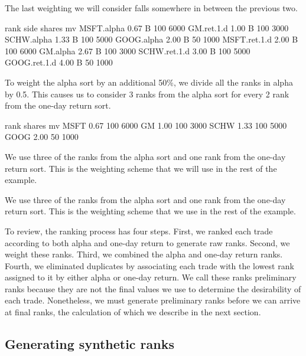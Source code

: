 \documentclass{article}
\begin{document}
The last weighting we will consider falls somewhere in between the
previous two.  

\begin{Schunk}
\begin{Soutput}
             rank side shares   mv
MSFT.alpha   0.67    B    100 6000
GM.ret.1.d   1.00    B    100 3000
SCHW.alpha   1.33    B    100 5000
GOOG.alpha   2.00    B     50 1000
MSFT.ret.1.d 2.00    B    100 6000
GM.alpha     2.67    B    100 3000
SCHW.ret.1.d 3.00    B    100 5000
GOOG.ret.1.d 4.00    B     50 1000
\end{Soutput}
\end{Schunk}

To weight the alpha sort by an additional 50\%, we divide all the
ranks in alpha by 0.5.  This causes us to consider 3 ranks from the
alpha sort for every 2 rank from the one-day return sort.

\begin{Schunk}
\begin{Soutput}
     rank shares   mv
MSFT 0.67    100 6000
GM   1.00    100 3000
SCHW 1.33    100 5000
GOOG 2.00     50 1000
\end{Soutput}
\end{Schunk}

We use three of the ranks from the alpha sort and one
rank from the one-day return sort.  This is the weighting scheme that
we will use in the rest of the example.

We use three of the ranks from the alpha sort and one
rank from the one-day return sort.  This is the weighting scheme that
we use in the rest of the example.

To review, the ranking process has four steps.  First, we ranked each
trade according to both alpha and one-day return to generate raw
ranks.  Second, we weight these ranks.  Third, we combined the alpha
and one-day return ranks.  Fourth, we eliminated duplicates by
associating each trade with the lowest rank assigned to it by either
alpha or one-day return.  We call these ranks preliminary ranks
because they are not the final values we use to determine the
desirability of each trade.  Nonetheless, we must generate preliminary
ranks before we can arrive at final ranks, the calculation of which we
describe in the next section.

\subsection{Generating synthetic ranks}
\label{generating synthetic ranks}
\end{document}
